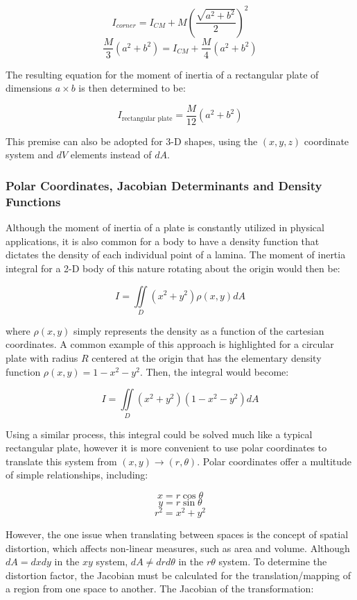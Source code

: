 \[I_{corner} = I_{CM} + M\left(\frac{\sqrt{a^2+b^2}}{2}\right)^2\]
\[\frac{M}{3}\left(a^2+b^2\right) = I_{CM} + \frac{M}{4}\left(a^2+b^2\right)\]

The resulting equation for the moment of inertia of a rectangular plate of dimensions $a \times b$ is then determined to be:

\begin{equation}
I_{\text{rectangular plate}} = \frac{M}{12}\left(a^2+b^2\right)
\label{eq:final_moment_rectangular_plate}
\end{equation}

This premise can also be adopted for 3-D shapes, using the $(x,y,z)$ coordinate system and $dV$ elements instead of $dA$.

\subsubsection{Polar Coordinates, Jacobian Determinants and Density Functions}

Although the moment of inertia of a plate is constantly utilized in physical applications, it is also common for a body to have a density function that dictates the density of each individual point of a lamina. The moment of inertia integral for a 2-D body of this nature rotating about the origin would then be:

\[I = \iint\limits_{D} (x^2+y^2)\rho(x,y) dA\]

where $\rho(x,y)$ simply represents the density as a function of the cartesian coordinates. A common example of this approach is highlighted for a circular plate with radius $R$ centered at the origin that has the elementary density function $\rho(x,y) = 1 - x^2 - y^2$. Then, the integral would become:

\[I = \iint\limits_{D} (x^2+y^2)(1 - x^2 - y^2) dA\]

Using a similar process, this integral could be solved much like a typical rectangular plate, however it is more convenient to use polar coordinates to translate this system from $(x,y) \rightarrow (r, \theta)$. Polar coordinates offer a multitude of simple relationships, including:

\[x = r\cos\theta\]
\[y = r\sin\theta\]
\[r^2 = x^2 + y^2\]

However, the one issue when translating between spaces is the concept of spatial distortion, which affects non-linear measures, such as area and volume. Although $dA = dxdy$ in the $xy$ system, $dA \neq drd\theta$ in the $r \theta$ system. To determine the distortion factor, the Jacobian must be calculated for the translation/mapping of a region from one space to another. The Jacobian of the transformation:

